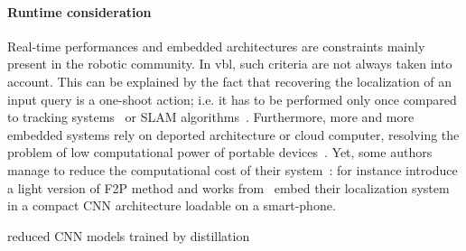      	\paragraph{Runtime consideration}
	     	\label{para:runtime}
	     	Real-time performances and embedded architectures are constraints mainly present in the robotic community. In \ac{vbl}, such criteria are not always taken into account. This can be explained by the fact that recovering the localization of an input query is a one-shoot action; i.e. it has to be performed only once compared to tracking systems~\citep{Marchand2016} or SLAM algorithms~\citep{Garcia-Fidalgo2015}. Furthermore, more and more embedded systems rely on deported architecture or cloud computer, resolving the problem of low computational power of portable devices~\citep{Middelberg2014}. Yet, some authors manage to reduce the computational cost of their system~\citep{Shotton2013,Glocker2015,Lynen2015}: for instance \citet{Feng2016a} introduce a light version of F2P method and works from~\citep{Weyand2016,Kendall2015,Contreras2017} embed their localization system in a compact CNN architecture loadable on a smart-phone. 
	     	
	     	reduced CNN models trained by distillation 
	        
        
        
            